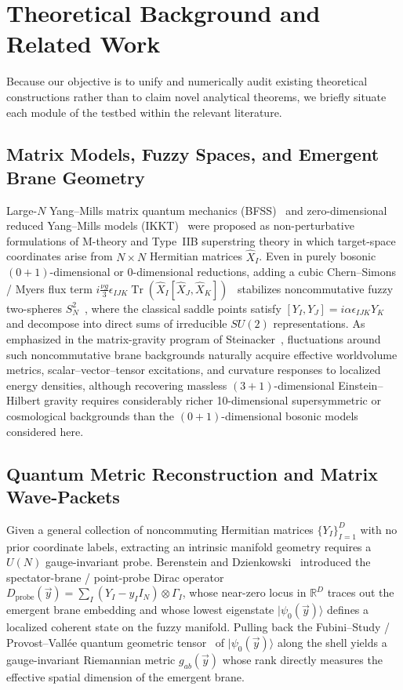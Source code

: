 \documentclass[11pt,a4paper]{article}
\DeclareMathOperator{\Tr}{Tr}
\begin{document}
\section{Theoretical Background and Related Work}
\label{sec:related}

Because our objective is to unify and numerically audit existing theoretical constructions rather than to claim novel analytical theorems, we briefly situate each module of the testbed within the relevant literature.

\subsection{Matrix Models, Fuzzy Spaces, and Emergent Brane Geometry}
Large-$N$ Yang--Mills matrix quantum mechanics (BFSS)~\cite{Banks1997} and zero-dimensional reduced Yang--Mills models (IKKT)~\cite{Ishibashi1997} were proposed as non-perturbative formulations of M-theory and Type~IIB superstring theory in which target-space coordinates arise from $N\times N$ Hermitian matrices $\hat{X}_I$. Even in purely bosonic $(0+1)$-dimensional or $0$-dimensional reductions, adding a cubic Chern--Simons / Myers flux term $i\frac{\nu g}{3}\epsilon_{IJK}\Tr(\hat{X}_I[\hat{X}_J,\hat{X}_K])$~\cite{Myers1999} stabilizes noncommutative fuzzy two-spheres $S^2_N$~\cite{Madore1992}, where the classical saddle points satisfy $[Y_I, Y_J] = i\alpha \epsilon_{IJK} Y_K$ and decompose into direct sums of irreducible $SU(2)$ representations. As emphasized in the matrix-gravity program of Steinacker~\cite{Steinacker2024}, fluctuations around such noncommutative brane backgrounds naturally acquire effective worldvolume metrics, scalar--vector--tensor excitations, and curvature responses to localized energy densities, although recovering massless $(3+1)$-dimensional Einstein--Hilbert gravity requires considerably richer 10-dimensional supersymmetric or cosmological backgrounds than the $(0+1)$-dimensional bosonic models considered here.

\subsection{Quantum Metric Reconstruction and Matrix Wave-Packets}
Given a general collection of noncommuting Hermitian matrices $\{Y_I\}_{I=1}^D$ with no prior coordinate labels, extracting an intrinsic manifold geometry requires a $U(N)$ gauge-invariant probe. Berenstein and Dzienkowski~\cite{Berenstein2012} introduced the spectator-brane / point-probe Dirac operator $D_{\mathrm{probe}}(\vec{y}) = \sum_I (Y_I - y_I I_N)\otimes \Gamma_I$, whose near-zero locus in $\mathbb{R}^D$ traces out the emergent brane embedding and whose lowest eigenstate $|\psi_0(\vec{y})\rangle$ defines a localized coherent state on the fuzzy manifold. Pulling back the Fubini--Study / Provost--Vall\'ee quantum geometric tensor~\cite{Provost1980} of $|\psi_0(\vec{y})\rangle$ along the shell yields a gauge-invariant Riemannian metric $g_{ab}(\vec{y})$ whose rank directly measures the effective spatial dimension of the emergent brane.
\end{document}
